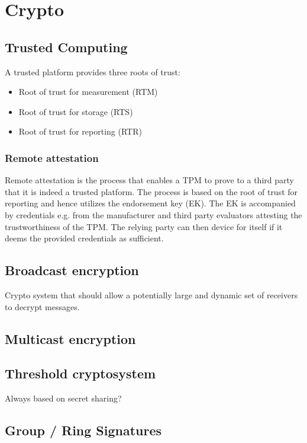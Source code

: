 \documentclass[journal]{IEEEtran}
\begin{document}
\section{Crypto}

\subsection{Trusted Computing}

A trusted platform provides three roots of trust:
\begin{itemize}
\item Root of trust for measurement (RTM)
\item Root of trust for storage (RTS)
\item Root of trust for reporting (RTR)
\end{itemize}

\subsubsection{Remote attestation}
Remote attestation is the process that enables a TPM to prove to a third party that it is indeed a trusted platform. The process is based on the root of trust for reporting and hence utilizes the endorsement key (EK). The EK is accompanied by credentials e.g. from the manufacturer and third party evaluators attesting the trustworthiness of the TPM. The relying party can then device for itself if it deems the provided credentials as sufficient. 


\subsection{Broadcast encryption}
Crypto system that should allow a potentially large and dynamic set of receivers to decrypt messages.

\subsection{Multicast encryption}

\subsection{Threshold cryptosystem}

Always based on secret sharing?

\subsection{Group / Ring Signatures} 
\end{document}
